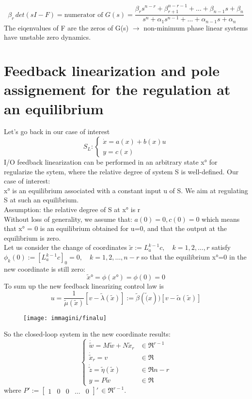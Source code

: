 \[
\beta_r \, det(sI-F)=\text{numerator of }G(s)=\frac{\beta_rs^{n-r}+\beta_{r+1}^{n-r-1}+\dots+\beta_{n-1}s+\beta_n}{s^n+\alpha_1s^{n-1}+\dots+\alpha_{n-1}s+\alpha_n}
\]
The eiqenvalues of F are the zeros of G(s) $\to$ non-minimum phase linear systems have unstable zero dynamics.
\section{Feedback linearization and pole assignement for the regulation at an equilibrium}Let's go back in our case of interest
\[S_L\colon \begin{cases}
	\dot{x}=a(x)+b(x)u\\
	y=c(x)
\end{cases}
\] 
I/O feedback linearization can be performed in an arbitrary state x° for regularize the sytem, where the relative degree of system S is well-defined.
Our case of interest:\\
x° is an equilibrium associated with a constant input u of S. We aim at regulating S at such an equilibrium.\\
Assumption: the relative degree of S at x° is r\\
Without loss of generality, we assume that: $a(0) = 0, c(0) = 0$
which means that x° = 0 is an equilibrium obtained for u=0, and that the output at the equilibrium is zero.\\
Let us consider the change of coordinates $\tilde{x}:=L^{k-1}_ac,\quad k=1,2,\dots,r$ satisfy $\phi_k(0):=[L^{k-1}_ac]_0=0,\quad k=1,2,\dots,n-r$ so that the equilibrium x°=0 in the new coordinate is still zero:\[\tilde{x}°=\phi(x°)=\phi(0)=0\]
To sum up the new feedback linearizing control law is \[
u=\frac{1}{\tilde{\mu}(\tilde{x})}[v-\tilde{\lambda}(\tilde{x})]:=\tilde{\beta}(\tilde(x))[v-\tilde{\alpha}(\tilde{x})]
\]\begin{figure}[H]
	\centering
	\texttt{[image: immagini/finalu]}
	\caption{}
	\label{fig:finalu}
\end{figure}
So the closed-loop system in the new coordinate results:
\begin{equation*}
	\left\{
	\begin{array}{ll}	
		\dot{\tilde{w}}=M\tilde{w}+N\tilde{x}_r & \in\Re^{r-1}\\
		\dot{\tilde{x}}_r=v & \in \Re\\
		\dot{\tilde{z}}=\tilde{\eta}(\tilde{x}) & \in \Re{n-r}\\
		y=P\tilde{w} & \in \Re
	\end{array}
	\right.
\end{equation*} where $P':=\begin{bmatrix}
1 & 0 & 0 & \dots & 0
\end{bmatrix}'\,\in\Re^{r-1}$.\\
